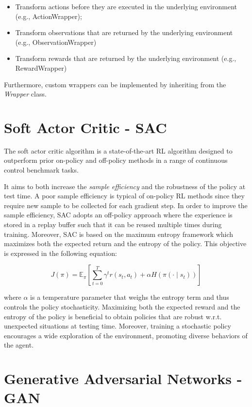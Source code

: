 \begin{itemize}
  \item Transform actions before they are executed in the underlying environment (e.g., ActionWrapper);
  \item Transform observations that are returned by the underlying environment (e.g., ObservationWrapper)
  \item Transform rewards that are returned by the underlying environment (e.g., RewardWrapper)
\end{itemize}

 Furthermore, custom wrappers can be implemented by inheriting from the \textit{Wrapper} class.

\section{Soft Actor Critic - SAC}
The soft actor critic algorithm \citep{art:sac} is a state-of-the-art RL algorithm designed to outperform prior on-policy and off-policy methods in a range of continuous control benchmark tasks. 

It aims to both increase the \textit{sample efficiency} and the robustness of the policy at test time. A poor sample efficiency is typical of on-policy RL methods since they require new sample to be collected for each gradient step. In order to improve the sample efficiency, SAC adopts an off-policy approach where the experience is stored in a replay buffer such that it can be reused multiple times during training. Moreover, SAC is based on the maximum entropy framework which maximizes both the expected return and the entropy of the policy. This objective is expressed in the following equation:

\begin{equation}
  J(\pi)=\mathbb{E}_{\pi}[\sum _{t=0}^{T}\gamma ^{t}r(s_{t},a_{t})+\alpha H(\pi(\cdot \mid s_{t}))]
\end{equation}

where $\alpha$ is a temperature parameter that weighs the entropy term and thus controls the policy stochasticity. Maximizing both the expected reward and the entropy of the policy is beneficial to obtain policies that are robust w.r.t. unexpected situations at testing time. Moreover, training a stochastic policy encourages a wide exploration of the environment, promoting diverse behaviors of the agent.

\section{Generative Adversarial Networks - GAN}

